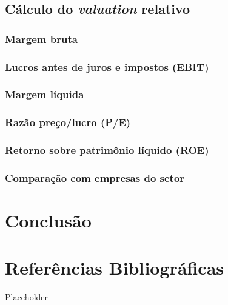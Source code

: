 \documentclass[grad,numbers]{coppe}
\begin{document}
  \hypertarget{cuxe1lculo-do-valuation-relativo}{%
  \section{\texorpdfstring{Cálculo do \emph{valuation} relativo}{Cálculo do valuation relativo}}\label{cuxe1lculo-do-valuation-relativo}}

  \hypertarget{margem-bruta}{%
  \subsection{Margem bruta}\label{margem-bruta}}

  \hypertarget{lucros-antes-de-juros-e-impostos-ebit}{%
  \subsection{Lucros antes de juros e impostos (EBIT)}\label{lucros-antes-de-juros-e-impostos-ebit}}

  \hypertarget{margem-luxedquida}{%
  \subsection{Margem líquida}\label{margem-luxedquida}}

  \hypertarget{razuxe3o-preuxe7olucro-pe}{%
  \subsection{Razão preço/lucro (P/E)}\label{razuxe3o-preuxe7olucro-pe}}

  \hypertarget{retorno-sobre-patrimuxf4nio-luxedquido-roe}{%
  \subsection{Retorno sobre patrimônio líquido (ROE)}\label{retorno-sobre-patrimuxf4nio-luxedquido-roe}}

  \hypertarget{comparauxe7uxe3o-com-empresas-do-setor}{%
  \subsection{Comparação com empresas do setor}\label{comparauxe7uxe3o-com-empresas-do-setor}}

  \hypertarget{conclusuxe3o}{%
  \chapter{Conclusão}\label{conclusuxe3o}}

  \hypertarget{referuxeancias-bibliogruxe1ficas}{%
  \chapter*{Referências Bibliográficas}\label{referuxeancias-bibliogruxe1ficas}}

  Placeholder

  \backmatter
  
  

\end{document}
